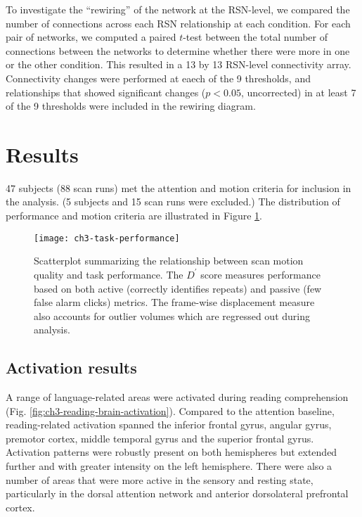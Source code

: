 To investigate the ``rewiring'' of the network at the RSN-level, we compared the number of connections across each RSN relationship at each condition. For each pair of networks, we computed a paired $t$-test between the total number of connections between the networks to determine whether there were more in one or the other condition. This resulted in a 13 by 13 RSN-level connectivity array. Connectivity changes were performed at eaech of the 9 thresholds, and relationships that showed significant changes ($p < 0.05$, uncorrected) in at least 7 of the 9 thresholds were included in the rewiring diagram.


\section{Results}

47 subjects (88 scan runs) met the attention and motion criteria for inclusion in the analysis. (5 subjects and 15 scan runs were excluded.) The distribution of performance and motion criteria are illustrated in Figure \ref{fig:ch3-task-performance}. 

\begin{figure}[t]
	\centering
	\texttt{[image: ch3-task-performance]}
    \caption[Description of scan motion quality and task performance.]{Scatterplot summarizing the relationship between scan motion quality and task performance. The $D^\prime$ score measures performance based on both active (correctly identifies repeats) and passive (few false alarm clicks) metrics. The frame-wise displacement measure also accounts for outlier volumes which are regressed out during analysis.}
	\label{fig:ch3-task-performance}
\end{figure}

\subsection{Activation results}

A range of language-related areas were activated during reading comprehension (Fig. \ref{fig:ch3-reading-brain-activation}). Compared to the attention baseline, reading-related activation spanned the inferior frontal gyrus, angular gyrus, premotor cortex, middle temporal gyrus and the superior frontal gyrus. Activation patterns were robustly present on both hemispheres but extended further and with greater intensity on the left hemisphere. There were also a number of areas that were more active in the sensory and resting state, particularly in the dorsal attention network and anterior dorsolateral prefrontal cortex.

